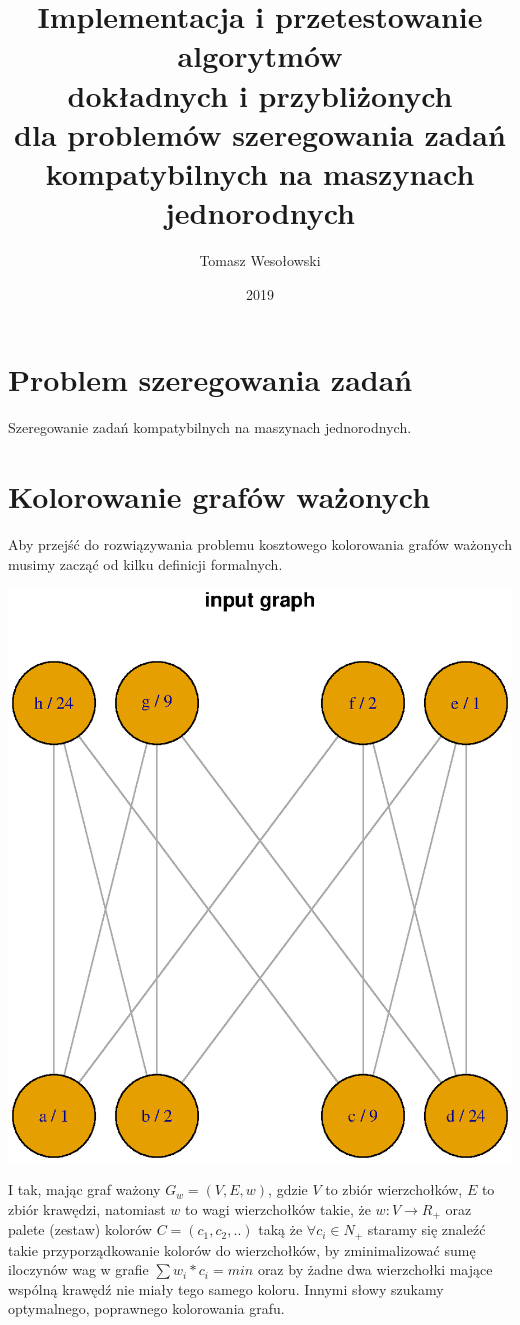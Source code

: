 \documentclass{article}
\title{%
	Implementacja i przetestowanie algorytmów \\
	dokładnych i przybliżonych \\
	dla problemów szeregowania zadań \\
	kompatybilnych na maszynach jednorodnych}
\author{Tomasz Wesołowski}
\date{2019}
\begin{document}
 
\maketitle
 
\tableofcontents
 
\section{Problem szeregowania zadań}

Szeregowanie zadań kompatybilnych na maszynach jednorodnych.

\section{Kolorowanie grafów ważonych}

Aby przejść do rozwiązywania problemu kosztowego kolorowania grafów ważonych musimy zacząć od kilku definicji formalnych. 

\includegraphics[scale=0.6]{graphs/reference_graph.eps}

I tak, mając graf ważony $G_w = (V,E,w)$, gdzie $V$ to zbiór wierzchołków, $E$ to zbiór krawędzi, natomiast $w$ to wagi wierzchołków takie, że  $w:V \rightarrow R_+$ oraz palete (zestaw) kolorów $C = (c_1, c_2, ..)$ taką że $\forall c_i \in N_+$ staramy się znaleźć takie przyporządkowanie kolorów do wierzchołków, by zminimalizować sumę iloczynów wag w grafie $\sum w_i * c_i = min$ oraz by żadne dwa wierzchołki mające wspólną krawędź nie miały tego samego koloru. Innymi słowy szukamy optymalnego, poprawnego kolorowania grafu.
\end{document}
